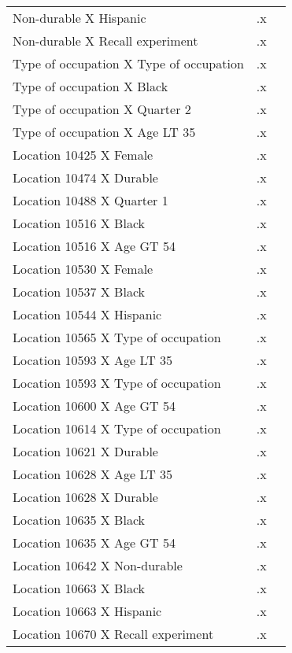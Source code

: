 \begin{tabular}{l*{2}{c}}
Non-durable X Hispanic&          .x&            \\
Non-durable X Recall experiment&          .x&            \\
Type of occupation X Type of occupation&          .x&            \\
Type of occupation X Black&          .x&            \\
Type of occupation X Quarter 2&          .x&            \\
Type of occupation X Age LT 35&          .x&            \\
Location 10425 X Female&          .x&            \\
Location 10474 X Durable&          .x&            \\
Location 10488 X Quarter 1&          .x&            \\
Location 10516 X Black&          .x&            \\
Location 10516 X Age GT 54&          .x&            \\
Location 10530 X Female&          .x&            \\
Location 10537 X Black&          .x&            \\
Location 10544 X Hispanic&          .x&            \\
Location 10565 X Type of occupation&          .x&            \\
Location 10593 X Age LT 35&          .x&            \\
Location 10593 X Type of occupation&          .x&            \\
Location 10600 X Age GT 54&          .x&            \\
Location 10614 X Type of occupation&          .x&            \\
Location 10621 X Durable&          .x&            \\
Location 10628 X Age LT 35&          .x&            \\
Location 10628 X Durable&          .x&            \\
Location 10635 X Black&          .x&            \\
Location 10635 X Age GT 54&          .x&            \\
Location 10642 X Non-durable&          .x&            \\
Location 10663 X Black&          .x&            \\
Location 10663 X Hispanic&          .x&            \\
Location 10670 X Recall experiment&          .x&            \\

\end{tabular}
